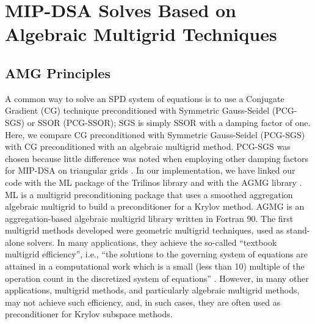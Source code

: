 \documentclass[preprint,10pt]{elsarticle}
\renewcommand{\(}{\left(}
\renewcommand{\)}{\right)}
\renewcommand{\[}{\left[}
\renewcommand{\]}{\right]}
\begin{document}
\section{MIP-DSA Solves Based on Algebraic Multigrid Techniques} \label{sec_amg}

\subsection{AMG Principles}

A common way to solve an SPD system of equations is to use a 
Conjugate Gradient (CG) technique preconditioned  with Symmetric Gauss-Seidel (PCG-SGS)
or SSOR (PCG-SSOR); SGS is simply SSOR with a damping factor of one. Here, we
compare CG preconditioned with Symmetric Gauss-Seidel (PCG-SGS) with CG preconditioned with an
algebraic multigrid method. PCG-SGS was chosen because little difference was noted 
when employing other damping factors for MIP-DSA on triangular grids \cite{wang_personal_comm}. 
In our implementation, we have linked our code with the ML package 
\cite{ml_guide} of the Trilinos library and with the AGMG library \cite{agmg_guide}. 
ML is a multigrid preconditioning package that uses a smoothed aggregation 
algebraic multigrid to build a preconditioner for a Krylov method. AGMG is an 
aggregation-based algebraic multigrid library written in Fortran 90.
%
The first multigrid methods developed were geometric multigrid techniques, used as 
stand-alone solvers. In many applications, they achieve the so-called 
``textbook multigrid efficiency'', i.e., ``the solutions to the governing 
system of equations are attained in a computational work which is a small 
(less than 10) multiple of the operation count in the discretized system of
equations'' 
\cite{textbook_eff}. However, in many other applications, multigrid methods, 
and particularly algebraic multigrid methods, may not achieve such efficiency, 
\cite{k_cycle} and, in such cases, they are often used as preconditioner for 
Krylov subspace methods. 
\end{document}
